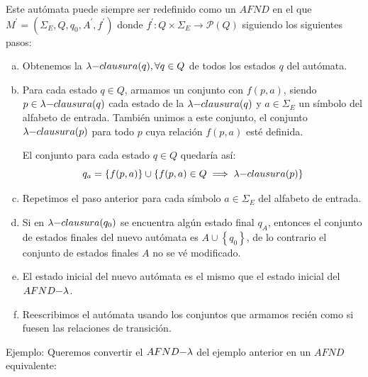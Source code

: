 \documentclass[12pt]{article}
\begin{document}
Este autómata puede siempre ser redefinido como un $ AFND $ en el que $ M^{\prime} = (\Sigma_{E},Q,q_{0},A^{\prime},f^{\prime}) $ donde $ f^{\prime}:Q\times \Sigma_{E} \to \mathcal{P}(Q)  $ siguiendo los siguientes pasos:
\begin{enumerate}[a)]
  \item Obtenemos la $ \lambda\text{{\textminus}}clausura(q),\forall q \in Q $ de todos los estados $ q $ del autómata.

  \item Para cada estado $ q \in Q $, armamos un conjunto con $ f(p,a) $, siendo $ p \in \lambda\text{{\textminus}}clausura(q) $ cada estado de la $ \lambda\text{{\textminus}}clausura(q) $ y $ a \in \Sigma_{E} $ un símbolo del alfabeto de entrada. También unimos a este conjunto, el conjunto $ \lambda\text{{\textminus}}clausura(p) $ para todo $ p $ cuya relación $ f(p,a) $ esté definida.

	  El conjunto para cada estado $ q \in Q $ quedaría así:
	  \[
		  q_{a} = \left\{f(p,a)\right\} \cup \left\{f(p,a) \in Q \implies \lambda\text{{\textminus}}clausura(p)\right\}
	  \]

  \item Repetimos el paso anterior para cada símbolo $ a \in \Sigma_{E} $ del alfabeto de entrada.

  \item Si en $ \lambda\text{{\textminus}}clausura(q_{0}) $ se encuentra algún estado final $ q_{A} $, entonces el conjunto de estados finales del nuevo autómata es $ A \cup \left\{q_{0}\right\} $, de lo contrario el conjunto de estados finales $ A $ no se vé modificado. 

  \item El estado inicial del nuevo autómata es el mismo que el estado inicial del $ AFND\text{{\textminus}}\lambda $.

  \item Reescribimos el autómata usando los conjuntos que armamos recién como si fuesen las relaciones de transición.
\end{enumerate}

Ejemplo: Queremos convertir el $ AFND\text{{\textminus}}\lambda $ del ejemplo anterior en un $ AFND $ equivalente:

\begin{center}
\end{center}
\end{document}

